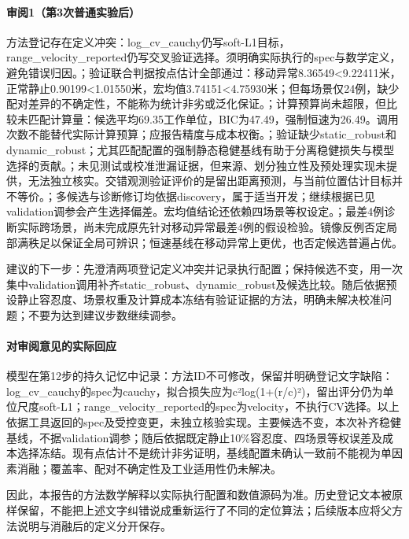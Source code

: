 \paragraph{审阅1（第3次普通实验后）}

方法登记存在定义冲突：log\_\allowbreak{}cv\_\allowbreak{}cauchy仍写soft-L1目标，range\_\allowbreak{}velocity\_\allowbreak{}reported仍写交叉验证选择。须明确实际执行的spec与数学定义，避免错误归因。；验证联合判据按点估计全部通过：移动异常8.36549<9.22411米，正常静止0.90199<1.01550米，宏均值3.74151<4.75930米；但每场景仅24例，缺少配对差异的不确定性，不能称为统计非劣或泛化保证。；计算预算尚未超限，但比较未匹配计算量：候选平均69.35工作单位，BIC为47.49，强制恒速为26.49。调用次数不能替代实际计算预算；应报告精度与成本权衡。；验证缺少static\_\allowbreak{}robust和dynamic\_\allowbreak{}robust；尤其匹配配置的强制静态稳健基线有助于分离稳健损失与模型选择的贡献。；未见测试或校准泄漏证据，但来源、划分独立性及预处理实现未提供，无法独立核实。交错观测验证评价的是留出距离预测，与当前位置估计目标并不等价。；多候选与诊断修订均依据discovery，属于适当开发；继续根据已见validation调参会产生选择偏差。宏均值结论还依赖四场景等权设定。；最差4例诊断实际跨场景，尚未完成原先针对移动异常最差4例的假设检验。镜像反例否定局部满秩足以保证全局可辨识；恒速基线在移动异常上更优，也否定候选普遍占优。

建议的下一步：先澄清两项登记定义冲突并记录执行配置；保持候选不变，用一次集中validation调用补齐static\_\allowbreak{}robust、dynamic\_\allowbreak{}robust及候选比较。随后依据预设静止容忍度、场景权重及计算成本冻结有验证证据的方法，明确未解决校准问题；不要为达到建议步数继续调参。

\paragraph{对审阅意见的实际回应}

模型在第12步的持久记忆中记录：方法ID不可修改，保留并明确登记文字缺陷：log\_\allowbreak{}cv\_\allowbreak{}cauchy的spec为cauchy，拟合损失应为c²log(1+(r/c)²)，留出评分仍为单位尺度soft-L1；range\_\allowbreak{}velocity\_\allowbreak{}reported的spec为velocity，不执行CV选择。以上依据工具返回的spec及受控变更，未独立核验实现。主要候选不变，本次补齐稳健基线，不据validation调参；随后依据既定静止10\%容忍度、四场景等权误差及成本选择冻结。现有点估计不是统计非劣证明，基线配置未确认一致前不能视为单因素消融；覆盖率、配对不确定性及工业适用性仍未解决。

因此，本报告的方法数学解释以实际执行配置和数值源码为准。历史登记文本被原样保留，不能把上述文字纠错说成重新运行了不同的定位算法；后续版本应将父方法说明与消融后的定义分开保存。

